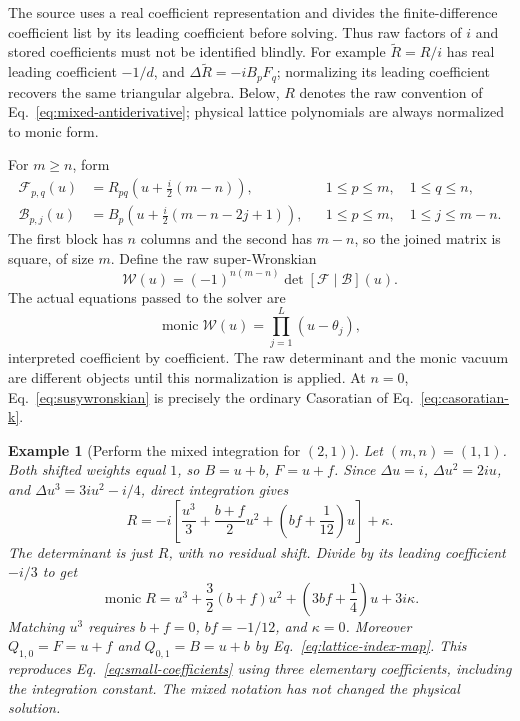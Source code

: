 \documentclass[11pt]{article}
\newtheorem{example}{Example}[section]
\begin{document}
The source uses a real coefficient representation and divides the
finite-difference coefficient list by its leading coefficient before
solving. Thus raw factors of $i$ and stored coefficients must not be
identified blindly. For example $\widetilde R=R/i$ has real leading
coefficient $-1/d$, and
$\Delta\widetilde R=-iB_pF_q$; normalizing its leading coefficient
recovers the same triangular algebra. Below, $R$ denotes the raw
convention of Eq.~\eqref{eq:mixed-antiderivative}; physical lattice
polynomials are always normalized to monic form.

For $m\ge n$, form
\begin{align}
 \mathcal F_{p,q}(u)&=R_{pq}\left(u+\frac{i}{2}(m-n)\right),
 &&1\le p\le m,\quad1\le q\le n,\\
 \mathcal B_{p,j}(u)&=B_p\left(u+\frac{i}{2}(m-n-2j+1)\right),
 &&1\le p\le m,\quad1\le j\le m-n.
\end{align}
The first block has $n$ columns and the second has $m-n$, so the joined
matrix is square, of size $m$. Define the raw super-Wronskian
\begin{equation}
 \label{eq:susywronskian}
 \mathcal W(u)=(-1)^{n(m-n)}\det[\mathcal F\mid\mathcal B](u).
\end{equation}
The actual equations passed to the solver are
\begin{equation}
 \label{eq:wronskian-relations}
 \operatorname{monic}\mathcal W(u)=\prod_{j=1}^L(u-\theta_j),
\end{equation}
interpreted coefficient by coefficient. The raw determinant and the
monic vacuum are different objects until this normalization is applied.
At $n=0$, Eq.~\eqref{eq:susywronskian} is precisely the ordinary
Casoratian of Eq.~\eqref{eq:casoratian-k}.

\begin{example}[Perform the mixed integration for $(2,1)$]
Let $(m,n)=(1,1)$. Both shifted weights equal $1$, so $B=u+b$, $F=u+f$.
Since $\Delta u=i$, $\Delta u^2=2iu$, and
$\Delta u^3=3iu^2-i/4$, direct integration gives
\[
 R=-i\left[\frac{u^3}{3}+\frac{b+f}{2}u^2+
             \left(bf+\frac1{12}\right)u\right]+\kappa.
\]
The determinant is just $R$, with no residual shift. Divide by its
leading coefficient $-i/3$ to get
\[
 \operatorname{monic}R=u^3+\frac32(b+f)u^2+
                         \left(3bf+\frac14\right)u+3i\kappa.
\]
Matching $u^3$ requires $b+f=0$, $bf=-1/12$, and $\kappa=0$.
Moreover $Q_{1,0}=F=u+f$ and $Q_{0,1}=B=u+b$ by
Eq.~\eqref{eq:lattice-index-map}. This reproduces
Eq.~\eqref{eq:small-coefficients} using three elementary coefficients,
including the integration constant. The mixed notation has not changed
the physical solution.
\end{example}
\end{document}
